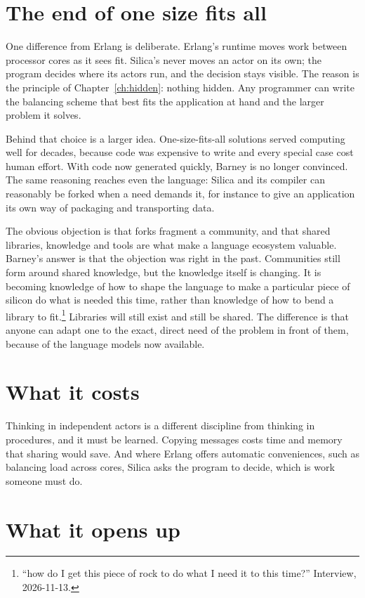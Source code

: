 \section{The end of one size fits all}

One difference from Erlang is deliberate. Erlang's runtime moves work between
processor cores as it sees fit. Silica's never moves an actor on its own; the
program decides where its actors run, and the decision stays visible. The reason
is the principle of Chapter~\ref{ch:hidden}: nothing hidden. Any programmer can
write the balancing scheme that best fits the application at hand and the
larger problem it solves.

Behind that choice is a larger idea. One-size-fits-all solutions served
computing well for decades, because code was expensive to write and every
special case cost human effort. With code now generated quickly, Barney is no
longer convinced. The same reasoning reaches even the language: Silica and its
compiler can reasonably be forked when a need demands it, for instance to give
an application its own way of packaging and transporting data.

The obvious objection is that forks fragment a community, and that shared
libraries, knowledge and tools are what make a language ecosystem valuable.
Barney's answer is that the objection was right in the past. Communities still
form around shared knowledge, but the knowledge itself is changing. It is
becoming knowledge of how to shape the language to make a particular piece of
silicon do what is needed this time, rather than knowledge of how to bend a
library to fit.\footnote{``how do I get this piece of rock to do what I need it
to this time?'' Interview, 2026-11-13.} Libraries will still exist and still be
shared. The difference is that anyone can adapt one to the exact, direct need of
the problem in front of them, because of the language models now available.

\section{What it costs}

Thinking in independent actors is a different discipline from thinking in
procedures, and it must be learned. Copying messages costs time and memory that
sharing would save. And where Erlang offers automatic conveniences, such as
balancing load across cores, Silica asks the program to decide, which is work
someone must do.

\section{What it opens up}


